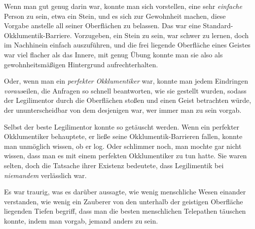Wenn man gut genug darin war, konnte man sich vorstellen, eine sehr \emph{einfache} Person zu sein, etwa ein Stein, und es sich zur Gewohnheit machen, diese Vorgabe anstelle all seiner Oberflächen zu belassen. Das war eine Standard-Okklumentik-Barriere. Vorzugeben, ein Stein zu sein, war schwer zu lernen, doch im Nachhinein einfach auszuführen, und die frei liegende Oberfläche eines Geistes war viel flacher als das Innere, mit genug Übung konnte man sie also als gewohnheitsmäßigen Hintergrund aufrechterhalten.

Oder, wenn man ein \emph{perfekter Okklumentiker} war, konnte man jedem Eindringen \emph{voraus}eilen, die Anfragen so schnell beantworten, wie sie gestellt wurden, sodass der Legilimentor durch die Oberflächen stoßen und einen Geist betrachten würde, der ununterscheidbar von dem desjenigen war, wer immer man zu sein vorgab.

Selbst der beste Legilimentor konnte so getäuscht werden. Wenn ein perfekter Okklumentiker behauptete, er ließe seine Okklumentik-Barrieren fallen, konnte man unmöglich wissen, ob er log. Oder schlimmer noch, man mochte gar nicht wissen, dass man es mit einem perfekten Okklumentiker zu tun hatte. Sie waren selten, doch die Tatsache ihrer Existenz bedeutete, dass Legilimentik bei \emph{niemandem} verlässlich war.

Es war traurig, was es darüber aussagte, wie wenig menschliche Wesen einander verstanden, wie wenig ein Zauberer von den unterhalb der geistigen Oberfläche liegenden Tiefen begriff, dass man die besten menschlichen Telepathen täuschen konnte, indem man vorgab, jemand anders zu sein.

